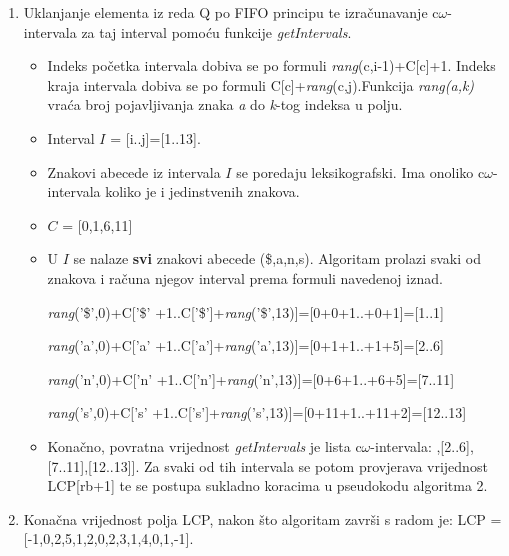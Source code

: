 \documentclass[times, utf8, seminar]{fer}
\begin{document}
\begin{enumerate}
\begin{enumerate}
\begin{itemize}
   \end{itemize}
   \item Uklanjanje elementa iz reda Q po FIFO principu te izračunavanje c$\omega$-\newline intervala za taj interval pomoću funkcije \textit{getIntervals}.
   \begin{itemize}
   \item Indeks početka intervala dobiva se po formuli \textit{rang}(c,i-1)+C[c]+1. Indeks kraja intervala dobiva se po formuli C[c]+\textit{rang}(c,j).Funkcija \textit{rang(a,k)} vraća broj pojavljivanja znaka \textit{a} do \textit{k}-tog indeksa u polju. 
   \item Interval $I$ = [i..j]=[1..13]. 
   \item Znakovi abecede iz intervala $I$ se poredaju leksikografski. Ima onoliko c$\omega$-intervala koliko je i jedinstvenih znakova.
   \item $C$ = [0,1,6,11]
   \item U $I$ se nalaze \textbf{svi} znakovi abecede (\$,a,n,s). Algoritam prolazi svaki od znakova i računa njegov interval prema formuli navedenoj iznad.
   \item  [\textit{rang}('\$',0)+C['\$']+1..C['\$']+\textit{rang}('\$',13)]=[0+0+1..+0+1]=[1..1]
   \item [\textit{rang}('a',0)+C['a']+1..C['a']+\textit{rang}('a',13)]=[0+1+1..+1+5]=[2..6]
   \item
   [\textit{rang}('n',0)+C['n']+1..C['n']+\textit{rang}('n',13)]=[0+6+1..+6+5]=[7..11]
   \item
   [\textit{rang}('s',0)+C['s']+1..C['s']+\textit{rang}('s',13)]=[0+11+1..+11+2]=[12..13]
   \item Konačno, povratna vrijednost \textit{getIntervals} je lista c$\omega$-intervala: \newline [[1..1],[2..6],[7..11],[12..13]]. Za svaki od tih intervala se potom provjerava vrijednost LCP[rb+1] te se postupa sukladno koracima u pseudokodu algoritma 2.
   \end{itemize}
     \item Konačna vrijednost polja LCP, nakon što algoritam završi s radom je: 
       	LCP = [-1,0,2,5,1,2,0,2,3,1,4,0,1,-1].
  \end{enumerate}

\end{enumerate}
\end{document}
